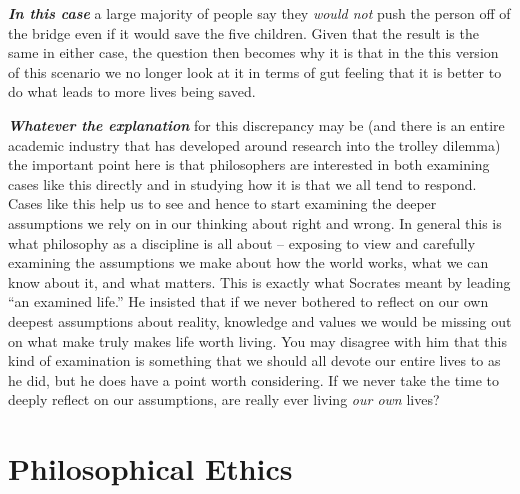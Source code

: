 \documentclass[
  12pt, openany]{book}
\begin{document}
\textbf{\emph{In this case}} a large majority of people say they \emph{would not} push the person off of the bridge even if it would save the five children. Given that the result is the same in either case, the question then becomes why it is that in the this version of this scenario we no longer look at it in terms of gut feeling that it is better to do what leads to more lives being saved.

\textbf{\emph{Whatever the explanation}} for this discrepancy may be (and there is an entire academic industry that has developed around research into the trolley dilemma) the important point here is that philosophers are interested in both examining cases like this directly and in studying how it is that we all tend to respond. Cases like this help us to see and hence to start examining the deeper assumptions we rely on in our thinking about right and wrong. In general this is what philosophy as a discipline is all about -- exposing to view and carefully examining the assumptions we make about how the world works, what we can know about it, and what matters. This is exactly what Socrates meant by leading ``an examined life.'' He insisted that if we never bothered to reflect on our own deepest assumptions about reality, knowledge and values we would be missing out on what make truly makes life worth living. You may disagree with him that this kind of examination is something that we should all devote our entire lives to as he did, but he does have a point worth considering. If we never take the time to deeply reflect on our assumptions, are really ever living \emph{our own} lives?

\hypertarget{philosophical-ethics}{%
\section{Philosophical Ethics}\label{philosophical-ethics}}
\end{document}
